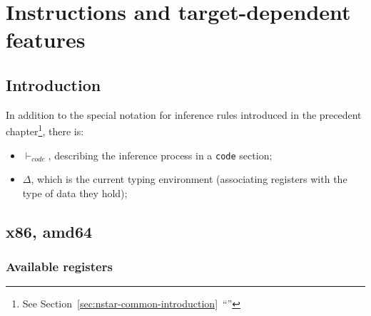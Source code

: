 \chapter{Instructions and target-dependent features}\label{chap:nstar-specific}

\section{Introduction}\label{sec:nstar-specific-introduction}

In addition to the special notation for inference rules introduced in the precedent chapter\footnote{See Section~\ref{sec:nstar-common-introduction}~``''}, there is:
\begin{itemize}
  \item $\vdash_{code}$, describing the inference process in a \texttt{code} section;
  \item $\Delta$, which is the current typing environment (associating registers with the type of data they hold);
\end{itemize}

\section{x86, amd64}\label{sec:nstar-specific-x86amd64}

\subsection{Available registers}\label{subsec:nstar-specific-x86amd64-registers}

